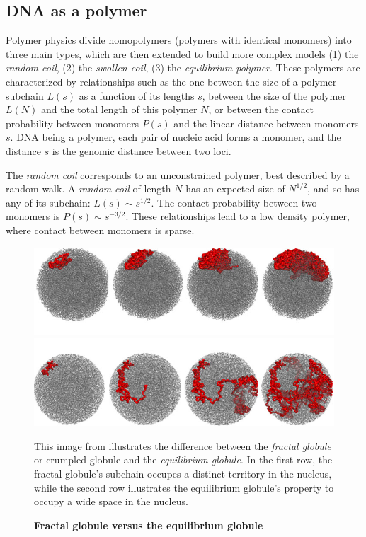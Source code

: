\subsection{DNA as a polymer}

Polymer physics divide homopolymers (polymers with identical monomers) into
three main types, which are then extended to build more complex models (1) the
\textit{random coil}, (2) the \textit{swollen coil}, (3) the
\textit{equilibrium polymer}. These polymers are characterized by
relationships such as the one between the size of a polymer subchain $L(s)$ as
a function of its lengths $s$, between the size of the polymer $L(N)$ and the
total length of this polymer $N$, or between the contact probability between
monomers $P(s)$ and the linear distance between monomers $s$. DNA being a
polymer, each pair of nucleic acid forms a monomer, and the distance $s$ is the
genomic distance between two loci.

The \textit{random coil} corresponds to an unconstrained polymer, best
described by a random walk. A \textit{random coil} of length $N$ has an
expected size of $N^{1/2}$, and so has any of its subchain: $L(s) \sim
s^{1/2}$. The contact probability between two monomers is $P(s) \sim
s^{-3/2}$. These relationships lead to a low density polymer, where contact
between monomers is sparse.



\begin{figure}
\begin{center}
\includegraphics[width=0.8\linewidth]{figures/mirny_fractal.png}
\includegraphics[width=0.8\linewidth]{figures/mirny_equilibrium.png}
\end{center}
\caption{\textbf{Fractal globule versus the equilibrium globule}}{This image
from \citet{mirny:fractal} illustrates the difference between the
\textit{fractal globule} or crumpled globule and the
\textit{equilibrium globule}. In the first row, the
fractal globule's subchain occupes a distinct territory in the nucleus, while
the second row illustrates the equilibrium globule's property to occupy a wide
space in the nucleus.}
\end{figure}

